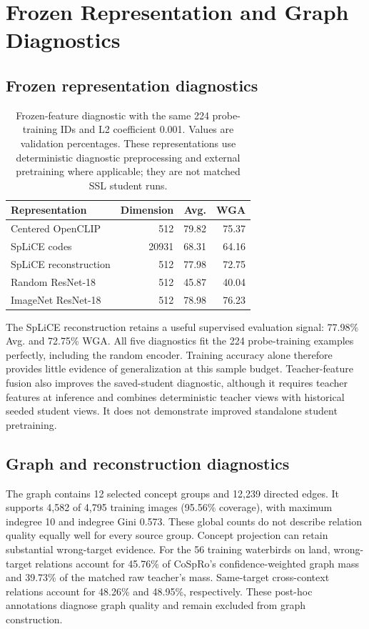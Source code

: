 \documentclass{article}
\begin{document}
\section{Frozen Representation and Graph Diagnostics}
\label{app:diagnostics}
\subsection{Frozen representation diagnostics}
\begin{table}[t]
\centering
\caption{Frozen-feature diagnostic with the same 224 probe-training IDs and
L2 coefficient 0.001. Values are validation percentages. These representations
use deterministic diagnostic preprocessing and external pretraining where
applicable; they are not matched SSL student runs.}
\begin{tabular}{lrrr}
\toprule
Representation & Dimension & Avg. & WGA \\
\midrule
Centered OpenCLIP & 512 & 79.82 & 75.37 \\
SpLiCE codes & 20931 & 68.31 & 64.16 \\
SpLiCE reconstruction & 512 & 77.98 & 72.75 \\
Random ResNet-18 & 512 & 45.87 & 40.04 \\
ImageNet ResNet-18 & 512 & 78.98 & 76.23 \\
\bottomrule
\end{tabular}
\label{tab:signal}
\end{table}

The SpLiCE reconstruction retains a useful supervised evaluation signal:
77.98\% Avg. and 72.75\% WGA. All five diagnostics fit the 224 probe-training
examples perfectly, including the random encoder. Training accuracy alone
therefore provides little evidence of generalization at this sample budget.
Teacher-feature fusion also improves the saved-student diagnostic, although it
requires teacher features at inference and combines deterministic teacher views
with historical seeded student views. It does not demonstrate improved standalone
student pretraining.

\subsection{Graph and reconstruction diagnostics}
The graph contains 12 selected concept groups and 12,239 directed edges.
It supports 4,582 of 4,795 training images (95.56\% coverage), with maximum
indegree 10 and indegree Gini 0.573. These global counts do not describe
relation quality equally well for every source group. Concept projection
can retain substantial wrong-target evidence. For the 56 training waterbirds on land, wrong-target
relations account for 45.76\% of CoSpRo's confidence-weighted graph mass and 39.73\%
of the matched raw teacher's mass. Same-target cross-context relations account
for 48.26\% and 48.95\%, respectively. These post-hoc annotations diagnose graph
quality and remain excluded from graph construction.
\end{document}
